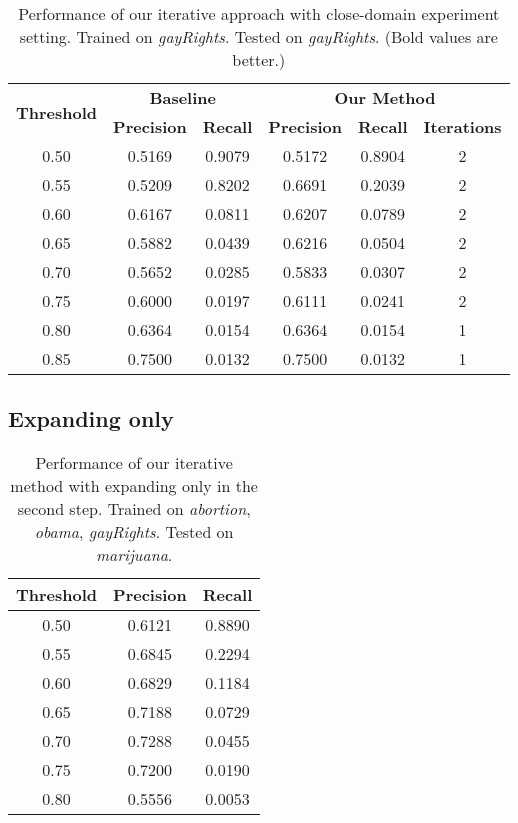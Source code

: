 \documentclass[11pt,a4paper]{article}
\begin{document}
\begin{table*}[h]
\begin{center}
\begin{tabular}{|c||c|c|c|c|c|}
\hline
\multicolumn{1}{|c|}{\multirow{2}{*}{\bf Threshold}} & \multicolumn{2}{c|}{\bf Baseline}  & \multicolumn{3}{c|}{\bf Our Method}    \\ \cline{2-6} 
\multicolumn{1}{|c|}{}   & \multicolumn{1}{l|}{\bf Precision} & \multicolumn{1}{l|}{\bf Recall} & \multicolumn{1}{l|}{\bf Precision} & \multicolumn{1}{c|}{\bf Recall} & \multicolumn{1}{l|}{\bf Iterations} \\ \hline
 \hline
0.50 & 0.5169 & 0.9079 & 0.5172 & 0.8904 & 2 \\
0.55 & 0.5209 & 0.8202 & 0.6691 & 0.2039 & 2 \\
0.60 & 0.6167 & 0.0811 & 0.6207 & 0.0789 & 2 \\
0.65 & 0.5882 & 0.0439 & 0.6216 & 0.0504 & 2 \\
0.70 & 0.5652 & 0.0285 & 0.5833 & 0.0307 & 2 \\
0.75 & 0.6000 & 0.0197 & 0.6111 & 0.0241 & 2 \\
0.80 & 0.6364 & 0.0154 & 0.6364 & 0.0154 & 1 \\
0.85 & 0.7500 & 0.0132 & 0.7500 & 0.0132 & 1
\\\hline
\end{tabular}
\end{center}
\caption{\label{tab:same-topic} Performance of our iterative approach with close-domain experiment setting. Trained on {\it gayRights}. Tested on {\it gayRights}. (Bold values are better.)}
\end{table*}

\subsection{Expanding only}

\begin{table}[h]
\begin{center}
\begin{tabular}{|c||c|c|}
\hline \bf Threshold & \bf Precision & \bf Recall \\ \hline\hline
0.50 & 0.6121 & 0.8890 \\
0.55 & 0.6845 & 0.2294 \\
0.60 & 0.6829 & 0.1184 \\
0.65 & 0.7188 & 0.0729 \\
0.70 & 0.7288 & 0.0455 \\
0.75 & 0.7200 & 0.0190 \\
0.80 & 0.5556 & 0.0053 \\ 
\hline
\end{tabular}
\end{center}
\caption{\label{tab:expanding} Performance of our iterative method with expanding only in the second step. Trained on {\it abortion}, {\it obama}, {\it gayRights}. Tested on {\it marijuana}.}
\end{table}
\end{document}
